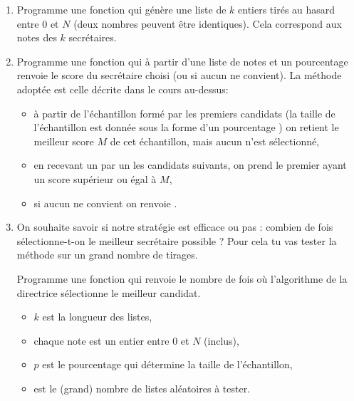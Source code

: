 \documentclass[11pt,class=report,crop=false]{standalone}
\begin{document}

\begin{activite}
	
	
\begin{enumerate}
	\item Programme une fonction  qui génère une liste de $k$ entiers 
	tirés au hasard entre $0$ et $N$ (deux nombres peuvent être identiques).		
	Cela correspond aux notes des $k$ secrétaires.
	
	\item Programme une fonction  qui à partir d'une liste de notes et un pourcentage renvoie le score du secrétaire choisi (ou  si aucun ne convient).
	La méthode adoptée est celle décrite dans le cours au-dessus:
	\begin{itemize}
		\item à partir de l'échantillon formé par les premiers candidats (la taille de l'échantillon est donnée sous la forme d'un pourcentage ) on retient le meilleur score $M$ de cet échantillon, mais aucun n'est sélectionné,
		\item en recevant un par un les candidats suivants, on prend le premier ayant un score supérieur ou égal à $M$,
		\item si aucun ne convient on renvoie .
	\end{itemize}
	

	\item On souhaite savoir si notre stratégie est efficace ou pas : combien de fois sélectionne-t-on le meilleur secrétaire possible ?
	Pour cela tu vas tester la méthode sur un grand nombre de tirages.
	
	
    Programme une fonction 
	qui renvoie le nombre de fois où l'algorithme de la directrice sélectionne le meilleur candidat.
	\begin{itemize}
		\item $k$ est la longueur des listes,
		\item chaque note est un entier entre $0$ et $N$ (inclus),
		\item $p$ est le pourcentage qui détermine la taille de l'échantillon,
		\item {} est le (grand) nombre de listes aléatoires à tester.
	\end{itemize}


\end{enumerate}
\end{activite}
\end{document}
